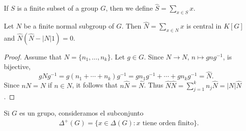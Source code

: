 %

If $S$ is a finite subset of a group $G$, then we define 
$\widehat{S}=\sum_{x\in S}x$. 

\begin{lemma}
	\label{lemma:sumN}
	Let $N$ be a finite normal subgroup of $G$. Then $\widehat{N}=\sum_{x\in N}x$ is central
	in $K[G]$ and $\widehat{N}(\widehat{N}-|N|1)=0$.
\end{lemma}

\begin{proof}
	Assume that $N=\{n_1,\dots,n_k\}$. Let 
	$g\in G$. Since $N\to N$, $n\mapsto gng^{-1}$, is bijective, 
	\[
		g\widehat{N}g^{-1}=g(n_1+\cdots+n_k)g^{-1}=gn_1g^{-1}+\cdots+gn_kg^{-1}=\widehat{N}.
	\]
	Since $nN=N$ if $n\in N$, it follows that $n\widehat{N}=\widehat{N}$. Thus 
	$\widehat{N}\widehat{N}=\sum_{j=1}^k n_j\widehat{N}=|N|\widehat{N}$.
\end{proof}




Si $G$ es un grupo, consideramos el subconjunto %
\begin{align*}
	&\Delta^+(G)=\{x\in \Delta(G):\text{$x$ tiene orden finito}\}.
\end{align*}

